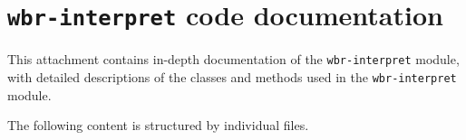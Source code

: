\section{\texttt{wbr-interpret} code documentation} \label{atta:interpretCode}
This attachment contains in-depth documentation of the \texttt{wbr-interpret} module, with detailed descriptions of the classes and methods
used in the \texttt{wbr-interpret} module.

The following content is structured by individual files.


\clearpage

\clearpage
